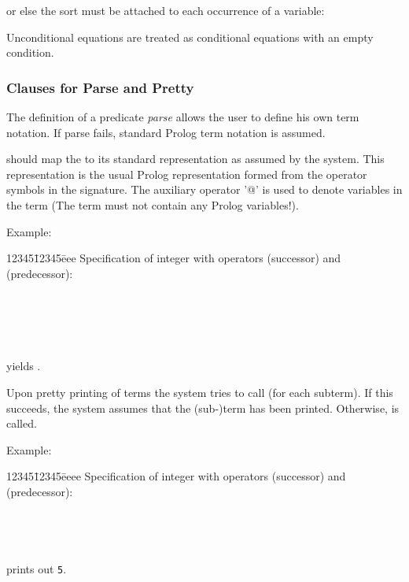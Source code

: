 {\noindent
or else the sort must be attached  to each occurrence of a variable:\bigskip

 \bigskip

\noindent
Unconditional equations are treated as conditional equations with an empty condition.


\subsubsection{Clauses for Parse and Pretty}
\label{ParseAndPretty}

\noindent
The definition of a predicate {\em parse} allows the user to define his
own term notation. If parse fails, standard Prolog term notation is assumed.\bigskip

\begin{command}
should map the  to its standard representation  as 
assumed by the system. This representation is the usual Prolog
representation formed from the operator symbols in the signature. The auxiliary
operator '@' is used to denote variables in the term (The term must not
contain any Prolog variables!).\bigskip


Example:\smallskip
\begin{tabbing}
12345\=12345\=eee\kill
\> Specification of integer with operators  (successor) and 
 (predecessor):\\
\\
\> \> \\
\> \> \\
\> \> \\
\\
\>  yields .
\end{tabbing}
\end{command}

\begin{command}
Upon pretty printing of terms the system tries to call 
 (for each subterm). If this succeeds, 
the system assumes that the (sub-)term has been
printed. Otherwise,  is called.\bigskip

Example:\smallskip
\begin{tabbing}
12345\=12345\=eeee\kill
\> Specification of integer with operators  (successor) and 
 (predecessor):\\
\\
\> \> \\
\> \>  \\
\\
\>  prints out {\tt 5}.
\end{tabbing}
\end{command}

}
